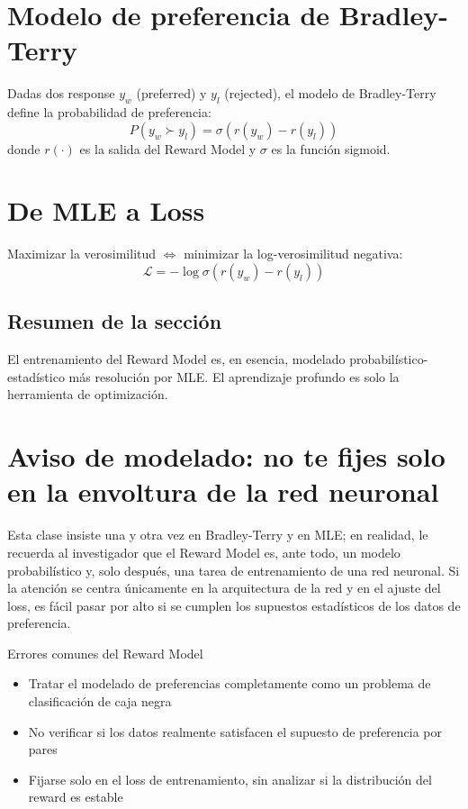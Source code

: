 \documentclass[a4paper]{article}
\begin{document}
\section{Modelo de preferencia de Bradley-Terry}
Dadas dos response $y_w$ (preferred) y $y_l$ (rejected), el modelo de Bradley-Terry define la probabilidad de preferencia:
$$P(y_w \succ y_l) = \sigma(r(y_w) - r(y_l))$$
donde $r(\cdot)$ es la salida del Reward Model y $\sigma$ es la función sigmoid.

\section{De MLE a Loss}
Maximizar la verosimilitud $\Leftrightarrow$ minimizar la log-verosimilitud negativa:
$$\mathcal{L} = -\log \sigma(r(y_w) - r(y_l))$$

\subsection{Resumen de la sección}
El entrenamiento del Reward Model es, en esencia, modelado probabilístico-estadístico más resolución por MLE. El aprendizaje profundo es solo la herramienta de optimización.

\newpage
\section{Aviso de modelado: no te fijes solo en la envoltura de la red neuronal}
Esta clase insiste una y otra vez en Bradley-Terry y en MLE; en realidad, le recuerda al investigador que el Reward Model es, ante todo, un modelo probabilístico y, solo después, una tarea de entrenamiento de una red neuronal. Si la atención se centra únicamente en la arquitectura de la red y en el ajuste del loss, es fácil pasar por alto si se cumplen los supuestos estadísticos de los datos de preferencia.

\begin{warningbox}{Errores comunes del Reward Model}
\begin{itemize}
  \item Tratar el modelado de preferencias completamente como un problema de clasificación de caja negra
  \item No verificar si los datos realmente satisfacen el supuesto de preferencia por pares
  \item Fijarse solo en el loss de entrenamiento, sin analizar si la distribución del reward es estable
\end{itemize}
\end{warningbox}
\end{document}

